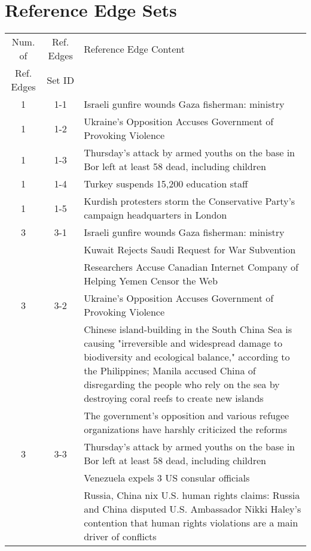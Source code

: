 \section{Reference Edge Sets}
\label{app-sec:ref-edge-sets}

\begin{table}[H]
\begin{tabular}{cc p{10cm}}
\toprule
\multicolumn{1}{c}{Num. of}			& \multicolumn{1}{c}{Ref. Edges}		& \multicolumn{1}{l}{Reference Edge Content} \\
\multicolumn{1}{c}{Ref. Edges}		& \multicolumn{1}{c}{Set ID}			& \multicolumn{1}{c}{} \\
\midrule
1 & 1-1 & Israeli gunfire wounds Gaza fisherman: ministry \\
\hline
1 & 1-2 & Ukraine’s Opposition Accuses Government of Provoking Violence \\
\hline
1 & 1-3 & Thursday's attack by armed youths on the base in Bor left at least 58 dead, including children \\
\hline
1 & 1-4 & Turkey suspends 15,200 education staff \\
\hline
1 & 1-5 & Kurdish protesters storm the Conservative Party's campaign headquarters in London \\
\hline
3 & 3-1 & Israeli gunfire wounds Gaza fisherman: ministry \\
 &  & Kuwait Rejects Saudi Request for War Subvention \\
 &  & Researchers Accuse Canadian Internet Company of Helping Yemen Censor the Web \\
\hline
3 & 3-2 & Ukraine’s Opposition Accuses Government of Provoking Violence \\
 &  & Chinese island-building in the South China Sea is causing "irreversible and widespread damage to biodiversity and ecological balance," according to the Philippines; Manila accused China of disregarding the people who rely on the sea by destroying coral reefs to create new islands \\
 &  & The government's opposition and various refugee organizations have harshly criticized the reforms \\
\hline
3 & 3-3 & Thursday's attack by armed youths on the base in Bor left at least 58 dead, including children \\
 &  & Venezuela expels 3 US consular officials \\
 &  & Russia, China nix U.S. human rights claims: Russia and China disputed U.S. Ambassador Nikki Haley's contention that human rights violations are a main driver of conflicts \\

\end{tabular}
\end{table}

